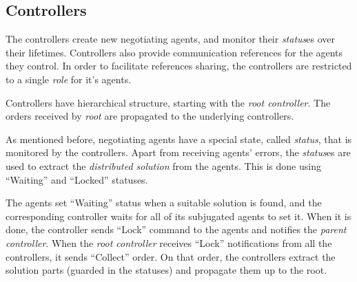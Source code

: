 




\subsection{Controllers}

The controllers create new negotiating agents, and monitor their \emph{status}es
over their lifetimes. Controllers also provide communication references for the
agents they control. In order to facilitate references sharing, the controllers
are restricted to a single \emph{role} for it's agents.

Controllers have hierarchical structure, starting with the \emph{root
  controller}. The orders received by \emph{root} are propagated to
the underlying controllers.

\medskip

As mentioned before, negotiating agents have a special state,
called \emph{status}, that is monitored by the controllers. Apart
from receiving agents' errors, the \emph{status}es are used to
extract the \emph{distributed solution} from the agents.
This is done using ``Waiting'' and ``Locked'' statuses.

The agents set ``Waiting'' status when a suitable solution is found,
and the corresponding controller waits for all of its subjugated
agents to set it. When it is done, the controller sends ``Lock''
command to the agents and notifies the \emph{parent controller}.
When the \emph{root controller} receives ``Lock'' notifications from
all the controllers, it sends ``Collect'' order. On that order, the controllers
extract the solution parts (guarded in the statuses) and propagate them up to
the root.









